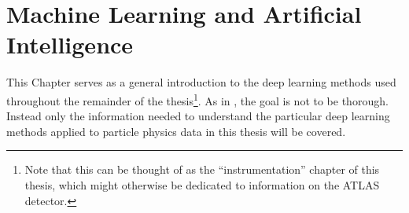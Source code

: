 
\chapter{Machine Learning and Artificial Intelligence}
\label{ch:ml}


This Chapter serves as a general introduction to the deep learning methods used throughout the remainder of the thesis\footnote{Note that this can be thought of as the ``instrumentation'' chapter of this thesis, which might otherwise be dedicated to information on the ATLAS detector.}.
As in , the goal is not to be thorough.
Instead only the information needed to understand the particular deep learning methods applied to particle physics data in this thesis will be covered.







